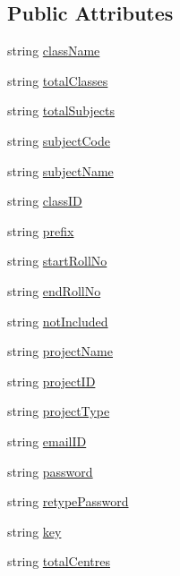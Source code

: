 \subsection*{Public Attributes}
\begin{DoxyCompactItemize}
\item 
string \hyperlink{classInputFieldName_ad8b28ebeabdabb5967542e317f549280}{class\-Name}
\item 
string \hyperlink{classInputFieldName_a5bf413dee6dcf29c1872e93f150d48c0}{total\-Classes}
\item 
string \hyperlink{classInputFieldName_ac58130077f39d82aaf447b1a67e9f70f}{total\-Subjects}
\item 
string \hyperlink{classInputFieldName_af1cc6871c33344c365e6e25ea482bd48}{subject\-Code}
\item 
string \hyperlink{classInputFieldName_a0614731b959afef6bb00f9fc957e7521}{subject\-Name}
\item 
string \hyperlink{classInputFieldName_a6a67c361f3b631fb6c3620c14a615fb9}{class\-I\-D}
\item 
string \hyperlink{classInputFieldName_a161d155f8faca2c5dea1bbd607b17553}{prefix}
\item 
string \hyperlink{classInputFieldName_a24baf5c915b4ee0fb8678e03adec043a}{start\-Roll\-No}
\item 
string \hyperlink{classInputFieldName_a06435f9ba5a529cbba4ee1ce9b02e5cc}{end\-Roll\-No}
\item 
string \hyperlink{classInputFieldName_a9ee6ee84737e1199bdfd9fb24c82c2c7}{not\-Included}
\item 
string \hyperlink{classInputFieldName_ab93b034743570810afe89aea88a7bbf6}{project\-Name}
\item 
string \hyperlink{classInputFieldName_ac4bd117f3137956473f1a1d5ce9106a5}{project\-I\-D}
\item 
string \hyperlink{classInputFieldName_aaa398a603dfe98f4eca022ec9d90bc09}{project\-Type}
\item 
string \hyperlink{classInputFieldName_a05541618feaaebe7a3f74b0bf8fa74b9}{email\-I\-D}
\item 
string \hyperlink{classInputFieldName_a318f819ef4663d7e5f40d91180093cb9}{password}
\item 
string \hyperlink{classInputFieldName_acd50095ae8540a735bcd5787b904b06c}{retype\-Password}
\item 
string \hyperlink{classInputFieldName_a26cffcb455cb1b977aa60b68c5b48fe4}{key}
\item 
string \hyperlink{classInputFieldName_af88ac102ec3a4adbb9edc7c3d61919cb}{total\-Centres}

\end{DoxyCompactItemize}
